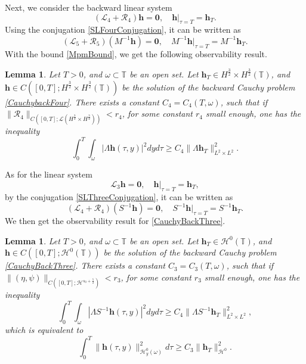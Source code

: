 \documentclass[12pt]{amsart}
\newtheorem{lemma}[theorem]{Lemma}
\theoremstyle{remark}
\theoremstyle{definition}
\numberwithin{equation}{section}
\renewcommand{\H}{{\mathcal H }}
\newcommand{\f}{\frac}
\newcommand{\T}{{\mathbb T}}
\newcommand{\mL}{\mathcal{L}}
\newcommand{\mR}{\mathcal{R}}
\begin{document}
Next, we consider the backward linear system 
\begin{equation} \label{CauchybackFour}
  (\mL_4 + \mR_4) \mathbf{h} = \mathbf{0}, \quad \mathbf{h}|_{\tau=T} = \mathbf{h}_{T}.
\end{equation}
Using the conjugation \eqref{SLFourConjugation}, it can be written as
\begin{equation*} 
 (\mL_5 + \mR_5) (M^{-1}\mathbf{h}) = \mathbf{0}, \quad M^{-1}\mathbf{h}|_{\tau=T} = M^{-1}\mathbf{h}_{T}.  
\end{equation*}
With the bound \eqref{MpmBound}, we get the following observability result.
\begin{lemma} \label{t:ObserveFour}
Let $T>0$, and $\omega \subset \T$ be an open set.
Let $\textbf{h}_T \in H^{\f32} \times H^{\f32}(\T)$, and $\textbf{h} \in C([0,T]; H^{\f32}\times H^{\f32}(\T))$ be the solution of the backward Cauchy problem \eqref{CauchybackFour}.
There exists a constant $C_4 = C_4(T,\omega)$, such that if $\| \mR_4\|_{C([0,T]; \mL(H^\f32\times H^\f32))}< r_4$, for some constant $r_4$ small enough, one has the inequality
\begin{equation}\label{ObserveFour}
    \int_0^T \int_\omega |\Lambda\mathbf{h}(\tau,y)|^2 dyd\tau \geq C_4 \| \Lambda\mathbf{h}_{T}\|_{L^2\times L^2}^2.
\end{equation}
\end{lemma}

As for the linear system 
\begin{equation} \label{CauchyBackThree}
  \mL_3  \mathbf{h} = \mathbf{0}, \quad \mathbf{h}|_{\tau=T} = \mathbf{h}_{T},
\end{equation}
by the conjugation \eqref{SLThreeConjugation}, it can be written as
\begin{equation*} 
 (\mL_4 + \mR_4) (S^{-1}\mathbf{h}) = \mathbf{0}, \quad S^{-1}\mathbf{h}|_{\tau=T} = S^{-1}\mathbf{h}_{T}.  
\end{equation*}
We then get the observability result for \eqref{CauchyBackThree}.

\begin{lemma} \label{t:ObserveThree}
Let $T>0$, and $\omega \subset \T$ be an open set.
Let $\textbf{h}_T \in \H^0(\T)$, and $\textbf{h} \in C([0,T]; \H^0(\T))$ be the solution of the backward Cauchy problem \eqref{CauchyBackThree}.
There exists a constant $C_3 = C_3(T,\omega)$, such that if $\| (\eta, \psi)\|_{C([0,T]; \H^{s_0 +\f52})}< r_3$, for some constant $r_3$ small enough, one has the inequality
\begin{equation*}
\int_0^T \int_\omega |\Lambda S^{-1}\mathbf{h}(\tau, y)|^2 dyd\tau \geq C_4 \| \Lambda S^{-1}\mathbf{h}_{T}\|_{L^2\times L^2}^2,
\end{equation*}
which is equivalent to  
\begin{equation}\label{ObserveThree}
    \int_0^T \|\mathbf{h}(\tau,y)\|_{\H^0_y(\omega)}^2 d\tau \geq C_3 \| \mathbf{h}_{T}\|_{\H^0}^2.
\end{equation}
\end{lemma}
\end{document}
